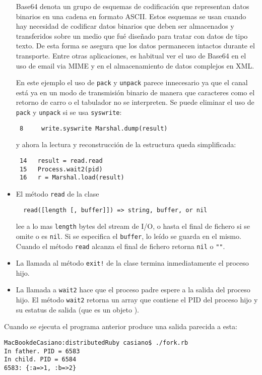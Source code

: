\begin{itemize}
Base64 denota un grupo de esquemas de codificación que representan datos binarios
en una cadena en formato ASCII.
Estos esquemas se usan cuando hay necesidad de codificar datos binarios que deben 
ser almacenados y transferidos sobre un medio que fué diseñado para tratar con datos de tipo texto.
De esta forma se asegura  que los datos permanecen intactos durante el transporte.
Entre otras aplicaciones, es habitual ver el uso de Base64 en 
el uso de email via MIME y en el almacenamiento de datos complejos en XML.


En este ejemplo el uso de \verb|pack| y \verb|unpack| parece innecesario ya que el canal está ya en un modo de
transmisión binario de manera que caracteres como el retorno de carro o el tabulador no se interpreten.
Se puede eliminar el uso de \verb|pack| y \verb|unpack| si se usa \verb|syswrite|:
\begin{verbatim}
 8     write.syswrite Marshal.dump(result)
\end{verbatim}
y ahora la lectura y reconstrucción de la estructura queda simplificada:
\begin{verbatim}
 14   result = read.read
 15   Process.wait2(pid)
 16   r = Marshal.load(result)
\end{verbatim}
\item
El método \verb|read| de la clase  
\begin{verbatim}
  read([length [, buffer]]) => string, buffer, or nil 
\end{verbatim}

lee a lo mas \verb|length| bytes del stream de I/O, o hasta el final de fichero si se omite o es \verb|nil|. 
Si se especifica el \verb|buffer|, lo leído se guarda en el mismo.
Cuando el método \verb|read| alcanza el  final de fichero retorna \verb|nil| o \verb|""|. 
\item
La llamada al método \verb|exit!| de la clase  termina inmediatamente el proceso hijo.
\item
La llamada a \verb|wait2|
hace que el proceso padre espere a la salida del proceso hijo.
El método \verb|wait2| retorna un array que contiene el 
PID del proceso hijo y su estatus de salida (que es un objeto 
).
\end{itemize}


Cuando se ejecuta el programa anterior produce una salida parecida a esta:

\begin{verbatim}
MacBookdeCasiano:distributedRuby casiano$ ./fork.rb 
In father. PID = 6583
In child. PID = 6584
6583: {:a=>1, :b=>2}

\end{verbatim}


